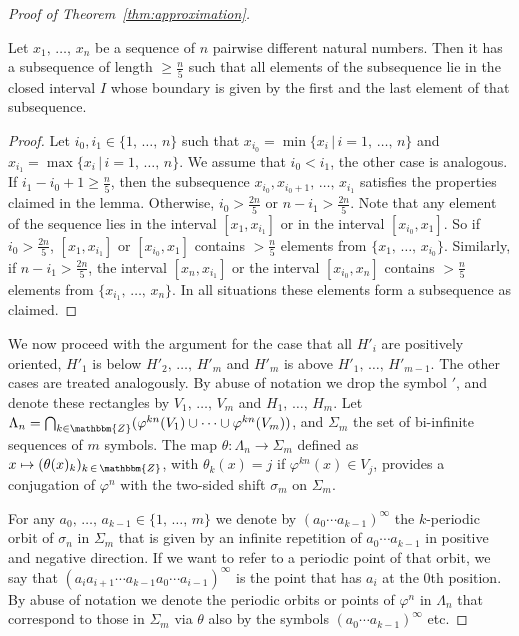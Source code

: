 \documentclass[AHL,Unicode,longabstracts,published]{cedram}
\newcommand{\Z}{\mathbbm{Z}}
\newcounter{claim}
\begin{document}
\begin{proof}[Proof of Theorem~\ref{thm:approximation}]
\begin{lemm}
Let $x_1, \,\ldots,\, x_n$ be a sequence of $n$ pairwise different natural numbers. Then it has a subsequence of length $\geq \frac{n}{5}$ such that all elements of the subsequence lie in the closed interval $I$ whose boundary is given by the first and the last element of that subsequence.
\end{lemm}

\begin{proof}
Let $i_0, i_1 \in \{1, \,\ldots,\, n\}$ such that $x_{i_0} = \min \{ x_i \, | \, i = 1,\, \ldots,\, n \}$ and $x_{i_1} = \max \{ x_i \, | \, i = 1,\, \ldots,\, n\}$. We assume that $i_0 < i_1$, the other case is analogous. If $i_1 -i_0 + 1 \geq \frac{n}{5}$, then the subsequence $x_{i_0}, x_{i_0 + 1}, \,\ldots,\, x_{i_1}$ satisfies the properties claimed in the lemma. Otherwise, $i_0> \frac{2n}{5}$ or $n-i_1 > \frac{2n}{5}$. Note that any element of the sequence lies in the interval $[x_1,x_{i_1}]$ or in the interval $[x_{i_0}, x_1]$. So if $i_0>\frac{2n}{5}$, $[x_1,x_{i_1}]$ or $[x_{i_0}, x_1]$ contains $> \frac{n}{5}$ elements from $\{x_1, \,\ldots,\, x_{i_0}\}$. Similarly, if $n-i_1 > \frac{2n}{5}$, the interval $[x_n, x_{i_1}]$ or the interval $[x_{i_0}, x_n]$ contains $> \frac{n}{5}$ elements from $\{x_{i_1},\,\ldots,\, x_{n}\}$. In all situations these elements form a subsequence as claimed.
\end{proof}

We now proceed with the argument for the case that all $H'_i$ are positively oriented, $H'_1$ is below $H'_2, \,\ldots,\, H'_{m}$ and $H'_m$ is above $H'_1, \,\ldots,\, H'_{m-1}$. The other cases are treated analogously. By abuse of notation we drop the symbol $'$, and denote these rectangles by $V_1, \,\ldots,\, V_m$ and $H_1,\, \ldots,\, H_m$. Let $\Lambda_n = \bigcap_{k\in \Z} (\varphi^{kn}(V_1) \cup \cdots \cup \varphi^{kn}(V_{m}))$, and $\Sigma_m$ the set of bi-infinite sequences of $m$ symbols. The map $\theta: \Lambda_n \to \Sigma_m$ defined as $x \mapsto (\theta(x)_k)_{k\, \in\, \Z}$, with $\theta_k(x) = j$ if $\varphi^{kn}(x) \in V_j$, provides a conjugation of $\varphi^n$ with the two-sided shift $\sigma_m$ on $\Sigma_m$.

For any $a_0,\, \ldots,\, a_{k-1} \in \{1, \,\ldots,\, m\}$ we denote by $(a_0\cdots a_{k-1})^{\infty}$ the  $k$-periodic orbit of $\sigma_n$ in $\Sigma_m$ that is given by an infinite repetition of $a_0\cdots a_{k-1}$ in positive and negative direction. If we want to refer to a periodic point of that orbit, we say that $(a_i a_{i+1} \cdots a_{k-1} a_0 \cdots a_{i-1})^{\infty}$ is the point that has $a_i$ at the $0$th position. By abuse of notation we denote the periodic orbits or points of $\varphi^n$ in $\Lambda_n$ that correspond to those in $\Sigma_m$ via $\theta$ also by the symbols $(a_0\cdots a_{k-1})^{\infty}$ etc.


\end{proof}
\end{document}
